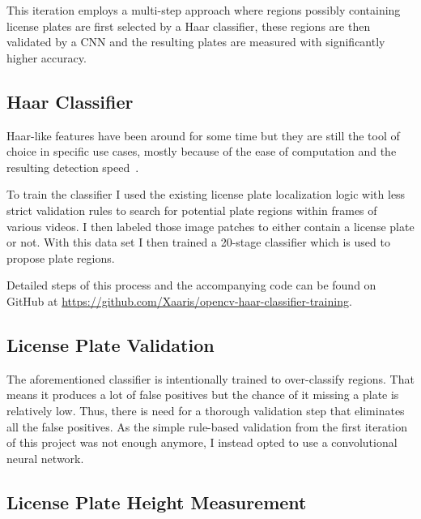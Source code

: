 This iteration employs a multi-step approach where regions possibly containing license plates are first selected by a Haar classifier, these regions are then validated by a CNN and the resulting plates are measured with significantly higher accuracy.

\subsection{Haar Classifier}

Haar-like features have been around for some time but they are still the tool of choice in specific use cases, mostly because of the ease of computation and the resulting detection speed~\cite{Viola2001}.

To train the classifier I used the existing license plate localization logic with less strict validation rules to search for potential plate regions within frames of various videos.
I then labeled those image patches to either contain a license plate or not.
With this data set I then trained a 20-stage classifier which is used to propose plate regions.

Detailed steps of this process and the accompanying code can be found on GitHub at \href{https://github.com/Xaaris/opencv-haar-classifier-training}{https://github.com/Xaaris/opencv-haar-classifier-training}.


\subsection{License Plate Validation}
The aforementioned classifier is intentionally trained to over-classify regions.
That means it produces a lot of false positives but the chance of it missing a plate is relatively low.
Thus, there is need for a thorough validation step that eliminates all the false positives.
As the simple rule-based validation from the first iteration of this project was not enough anymore, I instead opted to use a convolutional neural network.

\subsection{License Plate Height Measurement}

